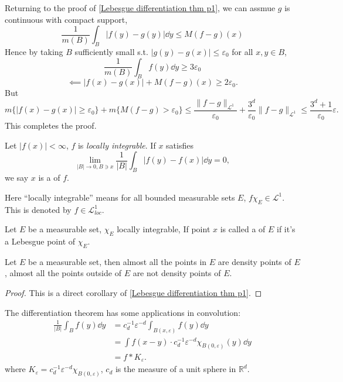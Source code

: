 Returning to the proof of \autoref{Lebesgue differentiation thm p1},
we can assmue $g$ is continuous with compact support,
 \[
\frac{1}{m(B)} \int_B |f(y)-g(y)|\dd y \le M(f-g)(x)
\]
Hence by taking $B$ sufficiently small s.t. $|g(y)-g(x)|\le \varepsilon_0$
for all $x,y\in B$,
\[
\frac{1}{m(B)}\int _B f(y)\dd y \ge 3\varepsilon_0
\]
\[
\impliedby |f(x)-g(x)| + M(f-g)(x) \ge 2\varepsilon_0.
\]
But
\[
m\{|f(x)-g(x)|\ge \varepsilon_0\} + m\{M(f-g)>\varepsilon_0\}
\le \frac{\lVert f-g \rVert _{\mathcal{L}^1}}{\varepsilon_0} +
\frac{3^d}{\varepsilon_0}\lVert f-g \rVert _{\mathcal{L}^1}
\le \frac{3^d+1}{\varepsilon_0}\varepsilon.
\]
This completes the proof.

\begin{definition}
	Let $|f(x)|<\infty$, $f$ is \textit{locally integrable}. If $x$ satisfies
	\[
	\lim_{|B|\to 0, B\ni x}\frac{1}{|B|} \int_B |f(y)-f(x)|\dd y = 0,
	\]
	we say $x$ is a  of $f$.
\end{definition}
\begin{remark}
    Here ``locally integrable'' means for all bounded measurable sets $E$,
	$f\chi_E\in \mathcal{L}^1$.
	This is denoted by $f\in \mathcal{L}_{loc}^1$.
\end{remark}

Let $E$ be a measurable set,  $\chi_E$ locally integrable,
If point $x$ is called a  of $E$
if it's a Lebesgue point of  $\chi_E$.

\begin{theorem}
    Let $E$ be a measurable set, then almost all the points in $E$
	are density points of $E$, almost all the points outside of $E$
	are not density points of $E$.
\end{theorem}
\begin{proof}[Proof]
    This is a direct corollary of \autoref{Lebesgue differentiation thm p1}.
\end{proof}

The differentiation theorem has some applications in convolution:
\begin{align*}
    \frac{1}{|B|}\int _B f(y)\dd y
	&= c_d^{-1} \varepsilon^{-d}\int_{B(x,\varepsilon)} f(y)\dd y\\
	&= \int f(x-y) \cdot c_d^{-1}\varepsilon^{-d}\chi_{B(0,\varepsilon)}(y)\dd y\\
	&= f*K_\varepsilon.
\end{align*}
where $K_\varepsilon=c_d^{-1} \varepsilon^{-d}\chi_{B(0,\varepsilon)}$,
$c_d$ is the measure of a unit sphere in  $\mathbb{R}^d$.

